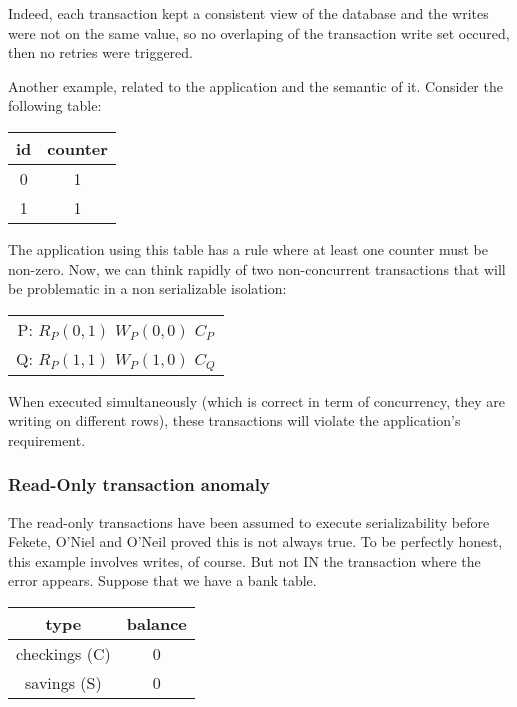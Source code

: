 Indeed, each transaction kept a consistent view of the database and the writes were not on the same value, so no overlaping of the transaction write set occured, then no retries were triggered.

Another example, related to the application and the semantic of it. Consider the following table:

\begin{table}[H]
  \centering
  \begin{tabular}{ c | c }
    id & counter \\
        \hline
    0 & 1 \\
    1 & 1 \\
  \end{tabular}
\end{table}

The application using this table has a rule where at least one counter must be non-zero. Now, we can think rapidly of two non-concurrent transactions that will be problematic in a non serializable isolation:

\begin{table}[H]
  \centering
  \begin{tabular}{ c }
    P:   $R_P(0, 1)$ $W_P(0, 0)$ $C_P$ \\
    Q:   $R_P(1, 1)$ $W_P(1, 0)$ $C_Q$ \\
  \end{tabular}
\end{table}

When executed simultaneously (which is correct in term of concurrency, they are writing on different rows), these transactions will violate the application's requirement.



\subsubsection{Read-Only transaction anomaly}
\label{sec:ro-anomaly}

The read-only transactions have been assumed to execute serializability before Fekete, O'Niel and O'Neil proved this is not always true\cite{DBLP:journals/sigmod/FeketeOO04}.
To be perfectly honest, this example involves writes, of course. But not IN the transaction where the error appears. Suppose that we have a bank table.

\begin{table}[H]
  \centering
  \begin{tabular}{ c | c }
    type & balance \\
    \hline
    checkings (C) & 0 \\
    savings (S) & 0 \\
  \end{tabular}
\end{table}


